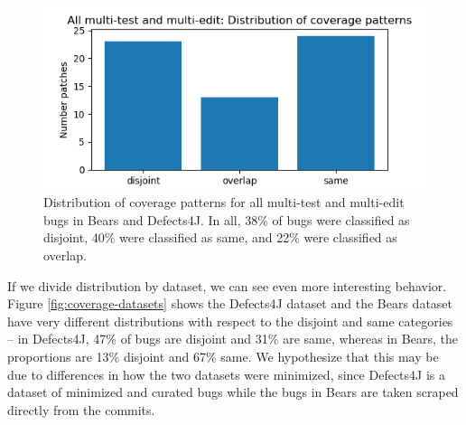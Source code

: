 \begin{figure}
	\includegraphics[width=\linewidth]{img/coverage-all.png}
	\caption{Distribution of coverage patterns for all multi-test and 
	multi-edit bugs in Bears and Defects4J. In all, 38\% of bugs were classified as disjoint, 40\% were 
	classified as same, and 22\% were classified as overlap.}
	\label{fig:coverage-all}
\end{figure}


If we divide distribution by dataset, we can see even more interesting 
behavior. Figure \ref{fig:coverage-datasets} shows the Defects4J dataset and the Bears dataset have 
very different distributions with respect to the disjoint and same categories -- in Defects4J, 47\% of 
bugs are disjoint and 31\% are same, whereas in Bears, the proportions are 13\% disjoint and 67\% 
same. We hypothesize that this may be due to differences in how the two datasets were 
minimized, since Defects4J is a dataset of minimized and curated bugs while the bugs in Bears are taken 
scraped directly from the commits.



